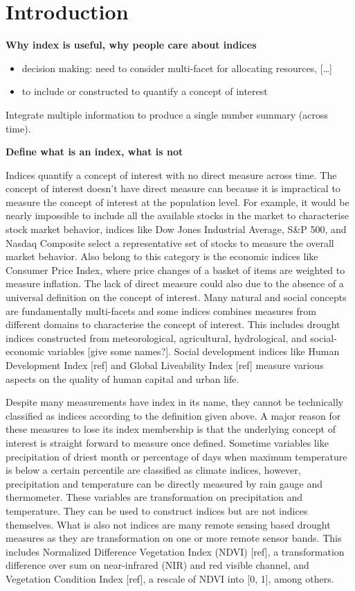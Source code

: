 \documentclass[
]{article}
\providecommand{\tightlist}{%
  \setlength{\itemsep}{0pt}\setlength{\parskip}{0pt}}\usepackage{longtable,booktabs,array}
\begin{document}
\hypertarget{introduction}{%
\section{Introduction}\label{introduction}}

\textbf{Why index is useful, why people care about indices}

\begin{itemize}
\tightlist
\item
  decision making: need to consider multi-facet for allocating
  resources, {[}\ldots{]}
\item
  to include or constructed to quantify a concept of interest
\end{itemize}

Integrate multiple information to produce a single number summary
(across time).

\textbf{Define what is an index, what is not}

Indices quantify a concept of interest with no direct measure across
time. The concept of interest doesn't have direct measure can because it
is impractical to measure the concept of interest at the population
level. For example, it would be nearly impossible to include all the
available stocks in the market to characterise stock market behavior,
indices like Dow Jones Industrial Average, S\&P 500, and Nasdaq
Composite select a representative set of stocks to measure the overall
market behavior. Also belong to this category is the economic indices
like Consumer Price Index, where price changes of a basket of items are
weighted to measure inflation. The lack of direct measure could also due
to the absence of a universal definition on the concept of interest.
Many natural and social concepts are fundamentally multi-facets and some
indices combines measures from different domains to characterise the
concept of interest. This includes drought indices constructed from
meteorological, agricultural, hydrological, and social-economic
variables {[}give some names?{]}. Social development indices like Human
Development Index {[}ref{]} and Global Liveability Index {[}ref{]}
measure various aspects on the quality of human capital and urban life.

Despite many measurements have index in its name, they cannot be
technically classified as indices according to the definition given
above. A major reason for these measures to lose its index membership is
that the underlying concept of interest is straight forward to measure
once defined. Sometime variables like precipitation of driest month or
percentage of days when maximum temperature is below a certain
percentile are classified as climate indices, however, precipitation and
temperature can be directly measured by rain gauge and thermometer.
These variables are transformation on precipitation and temperature.
They can be used to construct indices but are not indices themselves.
What is also not indices are many remote sensing based drought measures
as they are transformation on one or more remote sensor bands. This
includes Normalized Difference Vegetation Index (NDVI) {[}ref{]}, a
transformation difference over sum on near-infrared (NIR) and red
visible channel, and Vegetation Condition Index {[}ref{]}, a rescale of
NDVI into {[}0, 1{]}, among others.
\end{document}
